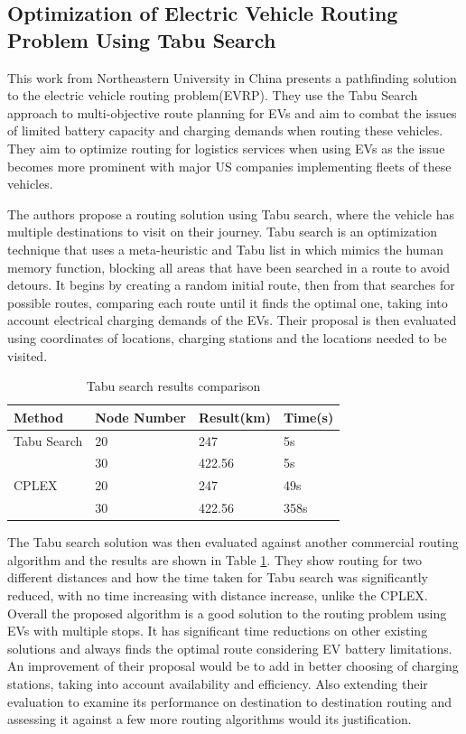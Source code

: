 \documentclass[11pt]{report}
\begin{document}
\subsection{Optimization of Electric Vehicle Routing Problem Using Tabu Search \autocite{optimizationTabuSearch}}

This work from Northeastern University in China presents a pathfinding solution to the electric vehicle routing problem(EVRP). They use the Tabu Search approach to multi-objective route planning for EVs and aim to combat the issues of limited battery capacity and charging demands when routing these vehicles. They aim to optimize routing for logistics services when using EVs as the issue becomes more prominent with major US companies implementing fleets of these vehicles.

The authors propose a routing solution using Tabu search, where the vehicle has multiple destinations to visit on their journey. Tabu search is an optimization technique that uses a meta-heuristic and Tabu list in which mimics the human memory function, blocking all areas that have been searched in a route to avoid detours. It begins by creating a random initial route, then from that searches for possible routes, comparing each route until it finds the optimal one, taking into account electrical charging demands of the EVs. Their proposal is then evaluated using coordinates of locations, charging stations and the locations needed to be visited.

\begin{table}[h!]
\begin{center}
\begin{tabular}{|p{3cm} p{3cm} p{3cm} p{3cm}|} 
 \hline
 Method & Node Number & Result(km) & Time(s) \\
 \hline
 Tabu Search & 20 & 247 & 5s \\ 
 & 30 & 422.56 & 5s \\
 CPLEX & 20 & 247 & 49s \\
  & 30 & 422.56 & 358s \\
 \hline
\end{tabular}
\end{center}
\caption{Tabu search results comparison \autocite{optimizationTabuSearch}}
\label{table:2}
\end{table}

The Tabu search solution was then evaluated against another commercial routing algorithm and the results are shown in Table \ref{table:2}. They show routing for two different distances and how the time taken for Tabu search was significantly reduced, with no time increasing with distance increase, unlike the CPLEX. Overall the proposed algorithm is a good solution to the routing problem using EVs with multiple stops. It has significant time reductions on other existing solutions and always finds the optimal route considering EV battery limitations. An improvement of their proposal would be to add in better choosing of charging stations, taking into account availability and efficiency. Also extending their evaluation to examine its performance on destination to destination routing and assessing it against a few more routing algorithms would its justification. 
\end{document}
